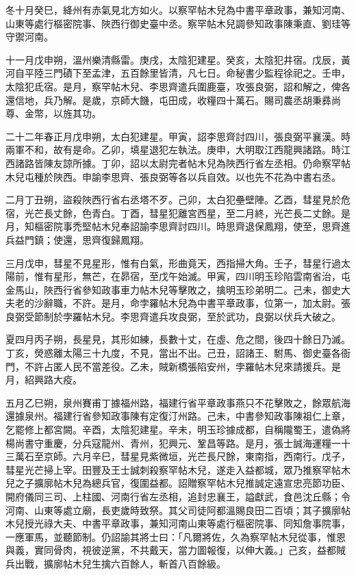 \begin{pinyinscope}
 冬十月癸巳，絳州有赤氣見北方如火。以察罕帖木兒為中書平章政事，兼知河南、山東等處行樞密院事、陜西行御史臺中丞。察罕帖木兒調參知政事陳秉直、劉珪等守禦河南。



 十一月戊申朔，溫州樂清縣雷。庚戌，太陰犯建星。癸亥，太陰犯井宿。戊辰，黃河自平陸三門磧下至孟津，五百餘里皆清，凡七日。命秘書少監程徐祀之。壬申，太陰犯氐宿。是月，察罕帖木兒、李思齊遣兵圍鹿臺，攻張良弼，詔和解之，俾各還信地，兵乃解。是歲，京師大饑，屯田成，收糧四十萬石。賜司農丞胡秉彞尚尊、金幣，以旌其功。



 二十二年春正月戊申朔，太白犯建星。甲寅，詔李思齊討四川，張良弼平襄漢。時兩軍不和，故有是命。乙卯，填星退犯左執法。庚申，大明取江西龍興諸路。時江西諸路皆陳友諒所據。丁卯，詔以太尉完者帖木兒為陜西行省左丞相。仍命察罕帖木兒屯種於陜西。申諭李思齊、張良弼等各以兵自效。以也先不花為中書右丞。



 二月丁丑朔，盜殺陜西行省右丞塔不歹。己卯，太白犯壘壁陣。乙酉，彗星見於危宿，光芒長丈餘，色青白。丁酉，彗星犯離宮西星，至二月終，光芒長二丈餘。是月，知樞密院事禿堅帖木兒奉詔諭李思齊討四川。時思齊退保鳳翔，使至，思齊進兵益門鎮；使還，思齊復歸鳳翔。



 三月戊申，彗星不見星形，惟有白氣，形曲竟天，西指掃大角。壬子，彗星行過太陽前，惟有星形，無芒，在昴宿，至戊午始滅。甲寅，四川明玉珍陷雲南省治，屯金馬山，陜西行省參知政事車力帖木兒等擊敗之，擒明玉珍弟明二。己未，御史大夫老的沙辭職，不許。是月，命孛羅帖木兒為中書平章政事，位第一，加太尉。張良弼受節制於孛羅帖木兒。李思齊遣兵攻良弼，至於武功，良弼以伏兵大破之。



 夏四月丙子朔，長星見，其形如練，長數十丈，在虛、危之間，後四十餘日乃滅。丁亥，熒惑離太陽三十九度，不見，當出不出。己丑，詔諸王、駙馬、御史臺各衙門，不許占匿人民不當差役。乙未，賊新橋張陷安州，孛羅帖木兒來請援兵。是月，紹興路大疫。



 五月乙巳朔，泉州賽甫丁據福州路，福建行省平章政事燕只不花擊敗之，餘眾航海還據泉州。福建行省參知政事陳有定復汀州路。己未，中書參知政事陳祖仁上章，乞罷修上都宮闕。辛酉，太陰犯建星。辛未，明玉珍據成都，自稱隴蜀王，遣偽將楊尚書守重慶，分兵寇龍州、青州，犯興元、鞏昌等路。是月，張士誠海運糧一十三萬石至京師。六月辛巳，彗星見紫微垣，光芒長尺餘，東南指，西南行。戊子，彗星光芒掃上宰。田豐及王士誠刺殺察罕帖木兒，遂走入益都城，眾乃推察罕帖木兒之子擴廓帖木兒為總兵官，復圍益都。詔贈察罕帖木兒推誠定遠宣忠亮節功臣、開府儀同三司、上柱國、河南行省左丞相，追封忠襄王，謚獻武，食邑沈丘縣；令河南、山東等處立廟，長吏歲時致祭。其父司徒阿都溫賜良田二百頃；其子擴廓帖木兒授光祿大夫、中書平章政事，兼知河南山東等處行樞密院事、同知詹事院事，一應軍馬，並聽節制。仍詔諭其將士曰：「凡爾將佐，久為察罕帖木兒從事，惟恩與義，實同骨肉，視彼逆黨，不共戴天，當力圖報復，以伸大義。」己亥，益都賊兵出戰，擴廓帖木兒生擒六百餘人，斬首八百餘級。




\end{pinyinscope}
